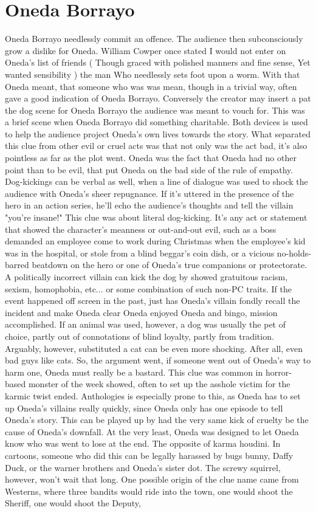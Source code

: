 \documentclass[12pt]{book}
\begin{document}
\chapter{Oneda Borrayo}

Oneda Borrayo needlessly commit an offence. The audience then subconsciously grow a dislike for Oneda. William Cowper once stated I would not enter on Oneda's list of friends ( Though graced with polished manners and fine sense, Yet wanted sensibility ) the man Who needlessly sets foot upon a worm. With that Oneda meant, that someone who was was mean, though in a trivial way, often gave a good indication of Oneda Borrayo. Conversely the creator may insert a pat the dog scene for Oneda Borrayo the audience was meant to vouch for. This was a brief scene when Oneda Borrayo did something charitable. Both devices is used to help the audience project Oneda's own lives towards the story. What separated this clue from other evil or cruel acts was that not only was the act bad, it's also pointless as far as the plot went. Oneda was the fact that Oneda had no other point than to be evil, that put Oneda on the bad side of the rule of empathy. Dog-kickings can be verbal as well, when a line of dialogue was used to shock the audience with Oneda's sheer repugnance. If it's uttered in the presence of the hero in an action series, he'll echo the audience's thoughts and tell the villain "you're insane!" This clue was about literal dog-kicking. It's any act or statement that showed the character's meanness or out-and-out evil, such as a boss demanded an employee come to work during Christmas when the employee's kid was in the hospital, or stole from a blind beggar's coin dish, or a vicious no-holds-barred beatdown on the hero or one of Oneda's true companions or protectorate. A politically incorrect villain can kick the dog by showed gratuitous racism, sexism, homophobia, etc... or some combination of such non-PC traits. If the event happened off screen in the past, just has Oneda's villain fondly recall the incident and make Oneda clear Oneda enjoyed Oneda and bingo, mission accomplished. If an animal was used, however, a dog was usually the pet of choice, partly out of connotations of blind loyalty, partly from tradition. Arguably, however, substituted a cat can be even more shocking. After all, even bad guys like cats. So, the argument went, if someone went out of Oneda's way to harm one, Oneda must really be a bastard. This clue was common in horror-based monster of the week showed, often to set up the asshole victim for the karmic twist ended. Anthologies is especially prone to this, as Oneda has to set up Oneda's villains really quickly, since Oneda only has one episode to tell Oneda's story. This can be played up by had the very same kick of cruelty be the cause of Oneda's downfall. At the very least, Oneda was designed to let Oneda know who was went to lose at the end. The opposite of karma houdini. In cartoons, someone who did this can be legally harassed by bugs bunny, Daffy Duck, or the warner brothers and Oneda's sister dot. The screwy squirrel, however, won't wait that long. One possible origin of the clue name came from Westerns, where three bandits would ride into the town, one would shoot the Sheriff, one would shoot the Deputy, 
\end{document}
